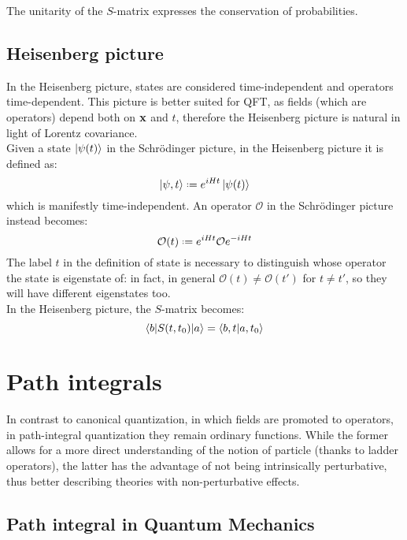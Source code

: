 The unitarity of the $ S $-matrix expresses the conservation of probabilities.

\subsection{Heisenberg picture}

In the Heisenberg picture, states are considered time-independent and operators time-dependent. This picture is better suited for QFT, as fields (which are operators) depend both on $ \mathbf{x} $ and $ t $, therefore the Heisenberg picture is natural in light of Lorentz covariance. \\
Given a state $ \ket{\psi(t)} $ in the Schrödinger picture, in the Heisenberg picture it is defined as:
\begin{equation}
  \ket{\psi,t} \defeq e^{i H t} \ket{\psi(t)}
\end{equation}
which is manifestly time-independent. An operator $ \mathcal{O} $ in the Schrödinger picture instead becomes:
\begin{equation}
  \mathcal{O}(t) \defeq e^{i H t} \mathcal{O} e^{-i H t}
\end{equation}
The label $ t $ in the definition of state is necessary to distinguish whose operator the state is eigenstate of: in fact, in general $ \mathcal{O}(t) \neq \mathcal{O}(t') $ for $ t \neq t' $, so they will have different eigenstates too. \\
In the Heisenberg picture, the $ S $-matrix becomes:
\begin{equation}
  \braket{b | S(t,t_0) | a} = \braket{b,t | a,t_0}
\end{equation}

\section{Path integrals}

In contrast to canonical quantization, in which fields are promoted to operators, in path-integral quantization they remain ordinary functions. While the former allows for a more direct understanding of the notion of particle (thanks to ladder operators), the latter has the advantage of not being intrinsically perturbative, thus better describing theories with non-perturbative effects.

\subsection{Path integral in Quantum Mechanics}

